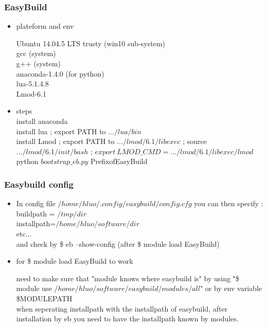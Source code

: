 \documentclass{beamer}
\begin{document}

\begin{frame}
\frametitle{EasyBuild}
\begin{itemize}

	\item   plateform and env

			Ubuntu 14.04.5 LTS trusty (win10 sub-system)\\
			gcc (system)\\
			g++ (system)\\
			anaconda-1.4.0 (for python)\\
			lua-5.1.4.8\\
			Lmod-6.1
			
	\item	steps \\
			install anaconda \\
			install lua ;
			export PATH to $.../lua/bin$ \\
			install Lmod ;
			export PATH to $.../lmod/6.1/libexec$ ;
			source $.../lmod/6.1/init/bash$ ;
			$export \ LMOD\_CMD=.../lmod/6.1/libexec/lmod$\\
			python $bootstrap\_eb.py$ PrefixofEasyBuild

\end{itemize}
\end{frame}


\begin{frame}
\frametitle{Easybuild config}
\begin{itemize}

	\item In config file $/home/hluo/.config/easybuild/config.cfg$
	you can then specify : \\
	buildpath = $/tmp/dir$ \\
	installpath=$/home/hluo/software/dir$\\
	etc...\\
	and check by \$ eb --show-config (after \$ module load EasyBuild)
	
	\item for \$ module load EasyBuild to work
	
	need to make sure that "module knows where easybuild is" by using "\$ module use $/home/hluo/software/easybuild/modules/all$" or by env variable \$MODULEPATH \\
	
	when seperating installpath with the installpath of easybuild, after installation by eb you need to have the installpath known by modules.

\end{itemize}
\end{frame}
\end{document}
